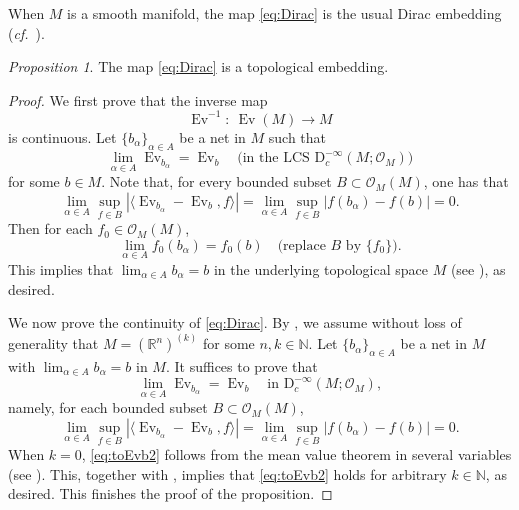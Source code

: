 \documentclass[12pt, a4paper]{amsart}
\newcommand{\BN}{{\mathbb {N}}}
\newcommand{\BR}{{\mathbb {R}}}
\newcommand{\CO}{{\mathcal {O}}}
\newcommand{\RD}{{\mathrm {D}}}
\newcommand{\Ev}{\operatorname{Ev}}
\newcommand{\la}{\langle}
\newcommand{\ra}{\rangle}
\newcommand{\be}{\begin {equation}}
\newcommand{\ee}{\end {equation}}
\newcommand{\cf}{\textit{cf.}~}
\theoremstyle{Theorem}
\theoremstyle{Theorem}
\theoremstyle{Theorem}
\theoremstyle{Theorem}
\theoremstyle{Plain}
\theoremstyle{remark}
\theoremstyle{remark}
\theoremstyle{Definition}
\newtheorem{prpd}[dfn]{Proposition}
\numberwithin{equation}{section}
\begin{document}
When $M$ is a smooth manifold, the map \eqref{eq:Dirac} is the usual
Dirac embedding (\cf \cite{Mi}).
\begin{prpd}\label{prop:dirac}
 The map \eqref{eq:Dirac} is a topological embedding.
\end{prpd}
\begin{proof}
  We first prove that the inverse map \[\Ev^{-1}: \ \Ev(M)\rightarrow M\] is continuous. Let $\{b_\alpha\}_{\alpha\in A}$ be a net in $M$ such that \[\lim_{\alpha\in A} \Ev_{b_\alpha}=\Ev_b \quad \text{(in the LCS $\RD^{-\infty}_c(M;\CO_M)$)}\] for some $b\in M$. 
Note that, for every bounded subset
$B\subset \CO_M(M)$, one has that
\[
\lim_{\alpha\in A}
\sup_{f\in B}
\left|\langle \Ev_{b_\alpha}-\Ev_b,f\rangle\right|
=
\lim_{\alpha\in A}
\sup_{f\in B}|f(b_\alpha)-f(b)|
=0.
\]
Then for each 
$f_0\in \CO_M(M)$,
\[\lim_{\alpha\in A} f_0(b_{\alpha
})=f_0(b)\quad \text{(replace $B$ by $\{f_0\}$)}.\] This implies that 
 $\lim_{\alpha\in A} b_{\alpha}=b$ in the underlying topological space $M$ (see \cite[Lemma 5.8]{CSW1}), as desired.
 
 We now prove the continuity of  \eqref{eq:Dirac}. 
 By \cite[Lemma 5.3]{CSW2}, we assume without loss of generality  that $M=(\BR^n)^{(k)}$ for some $n,k\in\BN$.
 Let $\{b_\alpha\}_{\alpha\in A}$ be a net in $M$ with $\lim_{\alpha\in A}b_\alpha= b$ in $M$. It suffices to prove that 
 \be \label{eq:toEvb}
\lim_{\alpha\in A}\Ev_{b_\alpha}= \Ev_b
\quad \text{in } \RD^{-\infty}_c(M;\CO_M),
\ee
namely, for each bounded subset $B\subset \CO_M(M)$,  \be\label{eq:toEvb2} \lim_{\alpha\in A}\sup_{f\in B}|\la \Ev_{b_{\alpha}}-\Ev_b,f\ra|=\lim_{\alpha\in A}\sup_{f\in B}|f(b_{\alpha})-f(b)|=0.\ee
 When $k=0$, \eqref{eq:toEvb2} follows from the mean value theorem in several variables (see \cite[Theorem 12.9]{Ap}). 
 This, together with \cite[Examples 3.11 and 4.4]{CSW1}, implies that 
 \eqref{eq:toEvb2} holds for arbitrary $k\in\BN$, as desired. This finishes the proof of the proposition.
\end{proof}
%
\end{document}
